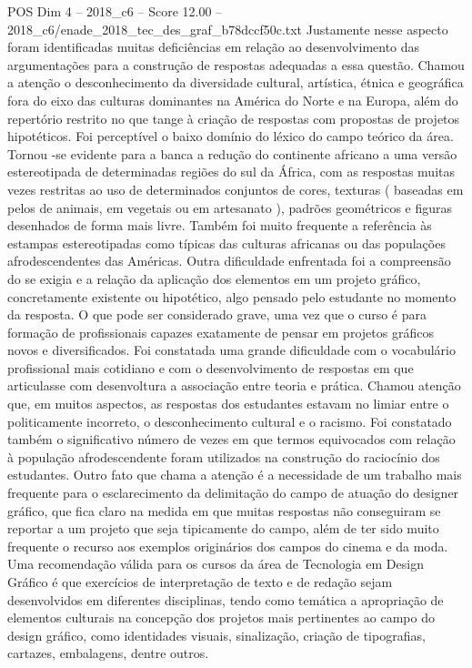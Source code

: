 \begin{textsample}{POS Dim 4 – 2018\_c6 – Score 12.00 – 2018\_c6/enade\_2018\_tec\_des\_graf\_b78dccf50c.txt}
Justamente nesse aspecto foram identificadas muitas deficiências em relação ao desenvolvimento das argumentações para a construção de respostas adequadas a essa questão.
Chamou a atenção o desconhecimento da diversidade cultural, artística, étnica e geográfica fora do eixo das culturas dominantes na América do Norte e na Europa, além do repertório restrito no que tange à criação de respostas com propostas de projetos hipotéticos.
Foi perceptível o baixo domínio do léxico do campo teórico da área.
Tornou -se evidente para a banca a redução do continente africano a uma versão estereotipada de determinadas regiões do sul da África, com as respostas muitas vezes restritas ao uso de determinados conjuntos de cores, texturas ( baseadas em pelos de animais, em vegetais ou em artesanato ), padrões geométricos e figuras desenhados de forma mais livre.
Também foi muito frequente a referência às estampas estereotipadas como típicas das culturas africanas ou das populações afrodescendentes das Américas.
Outra dificuldade enfrentada foi a compreensão do se exigia e a relação da aplicação dos elementos em um projeto gráfico, concretamente existente ou hipotético, algo pensado pelo estudante no momento da resposta.
O que pode ser considerado grave, uma vez que o curso é para formação de profissionais capazes exatamente de pensar em projetos gráficos novos e diversificados.
Foi constatada uma grande dificuldade com o vocabulário profissional mais cotidiano e com o desenvolvimento de respostas em que articulasse com desenvoltura a associação entre teoria e prática.
Chamou atenção que, em muitos aspectos, as respostas dos estudantes estavam no limiar entre o politicamente incorreto, o desconhecimento cultural e o racismo.
Foi constatado também o significativo número de vezes em que termos equivocados com relação à população afrodescendente foram utilizados na construção do raciocínio dos estudantes.
Outro fato que chama a atenção é a necessidade de um trabalho mais frequente para o esclarecimento da delimitação do campo de atuação do designer gráfico, que fica claro na medida em que muitas respostas não conseguiram se reportar a um projeto que seja tipicamente do campo, além de ter sido muito frequente o recurso aos exemplos originários dos campos do cinema e da moda.
Uma recomendação válida para os cursos da área de Tecnologia em Design Gráfico é que exercícios de interpretação de texto e de redação sejam desenvolvidos em diferentes disciplinas, tendo como temática a apropriação de elementos culturais na concepção dos projetos mais pertinentes ao campo do design gráfico, como identidades visuais, sinalização, criação de tipografias, cartazes, embalagens, dentre outros.

\end{textsample}
